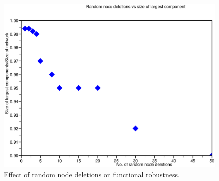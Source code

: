\documentclass[10pt]{article}
\begin{document}

\begin{figure}[htp]
\begin{center}
\includegraphics[width=4.5in]{continental-scc}%
\end{center}
\caption{\label{fig:scc}Effect of random node deletions on functional robustness.}
\end{figure}
\end{document}
